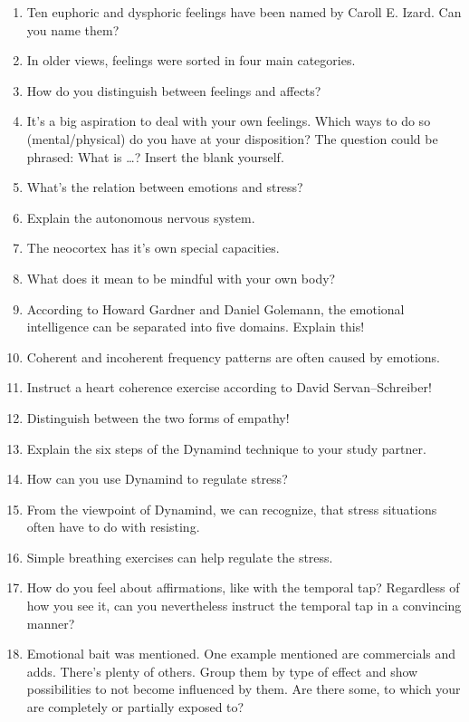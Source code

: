\documentclass[../main.tex]{subfiles}
\begin{document}
\begin{enumerate}
  \vspace{4mm}
\item Ten euphoric and dysphoric feelings have been named by Caroll E. Izard. Can you name them? %
\item In older views, feelings were sorted in four main categories. 
\item  How do you distinguish between feelings and affects? 
\item It's a big aspiration to deal with your own feelings.
  Which ways to do so (mental/physical) do you have at your disposition?
  The question could be phrased: What is \ldots? Insert the blank yourself.
  \vspace{4mm}
\item What's the relation between emotions and stress?
\item Explain the autonomous nervous system.
  \vspace{4mm}
\item The neocortex has it's own special capacities.
  \vspace{4mm}
\item What does it mean to be mindful with your own body?
  \vspace{4mm}
\item According to Howard Gardner and Daniel Golemann, the emotional intelligence can be separated into five domains.
  Explain this!
    \vspace{4mm}
\item Coherent and incoherent frequency patterns are often caused by emotions.
  \vspace{4mm}
\item Instruct a heart coherence exercise according to David Servan--Schreiber!
  \vspace{4mm}
\item Distinguish between the two forms of empathy!
  \vspace{4mm}
\item Explain the six steps of the Dynamind technique to your study partner.
\item How can you use Dynamind to regulate stress?
  \vspace{4mm}
\item From the viewpoint of Dynamind, we can recognize, that stress situations often have to do with resisting.
  \vspace{4mm}
\item Simple breathing exercises can help regulate the stress.
  \vspace{4mm}
\item How do you feel about affirmations, like with the temporal tap?
  Regardless of how you see it, can you nevertheless instruct the temporal tap in a convincing manner?
\item Emotional bait was mentioned. One example mentioned are commercials and adds.
  There's plenty of others.
  Group them by type of effect and show possibilities to not become influenced by them.
  Are there some, to which your are completely or partially exposed to?
\end{enumerate}
\end{document}
